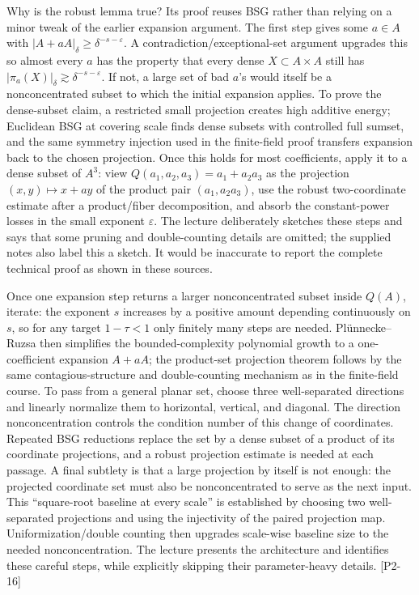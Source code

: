 Why is the robust lemma true? Its proof reuses BSG rather than relying on a minor tweak of the earlier expansion argument. The first step gives some \(a\in A\) with \(|A+aA|_\delta\ge\delta^{-s-\varepsilon}\). A contradiction/exceptional-set argument upgrades this so almost every \(a\) has the property that every dense \(X\subset A\times A\) still has \(|\pi_a(X)|_\delta\gtrsim\delta^{-s-\varepsilon}\). If not, a large set of bad \(a\)'s would itself be a nonconcentrated subset to which the initial expansion applies. To prove the dense-subset claim, a restricted small projection creates high additive energy; Euclidean BSG at covering scale finds dense subsets with controlled full sumset, and the same symmetry injection used in the finite-field proof transfers expansion back to the chosen projection. Once this holds for most coefficients, apply it to a dense subset of \(A^3\): view \(Q(a_1,a_2,a_3)=a_1+a_2a_3\) as the projection \((x,y)\mapsto x+ay\) of the product pair \((a_1,a_2a_3)\), use the robust two-coordinate estimate after a product/fiber decomposition, and absorb the constant-power losses in the small exponent \(\varepsilon\). The lecture deliberately sketches these steps and says that some pruning and double-counting details are omitted; the supplied notes also label this a sketch. It would be inaccurate to report the complete technical proof as shown in these sources.

Once one expansion step returns a larger nonconcentrated subset inside \(Q(A)\), iterate: the exponent \(s\) increases by a positive amount depending continuously on \(s\), so for any target \(1-\tau<1\) only finitely many steps are needed. Plünnecke--Ruzsa then simplifies the bounded-complexity polynomial growth to a one-coefficient expansion \(A+aA\); the product-set projection theorem follows by the same contagious-structure and double-counting mechanism as in the finite-field course. To pass from a general planar set, choose three well-separated directions and linearly normalize them to horizontal, vertical, and diagonal. The direction nonconcentration controls the condition number of this change of coordinates. Repeated BSG reductions replace the set by a dense subset of a product of its coordinate projections, and a robust projection estimate is needed at each passage. A final subtlety is that a large projection by itself is not enough: the projected coordinate set must also be nonconcentrated to serve as the next input. This ``square-root baseline at every scale'' is established by choosing two well-separated projections and using the injectivity of the paired projection map. Uniformization/double counting then upgrades scale-wise baseline size to the needed nonconcentration. The lecture presents the architecture and identifies these careful steps, while explicitly skipping their parameter-heavy details. {[}P2-16{]}

